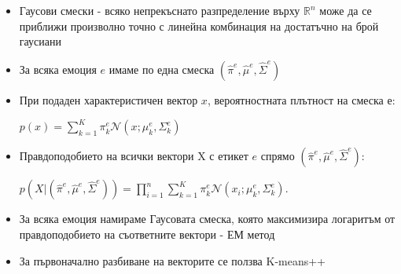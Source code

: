 \documentclass[9pt]{beamer}
\begin{document}
\begin{frame}[t]
    \begin{itemize}
        \item Гаусови смески
        \pause - всяко непрекъснато разпределение върху $\mathbb{R}^{n}$ може да се приближи произволно точно с линейна комбинация на достатъчно на брой гаусиани
        \pause
        \item За всяка емоция $e$ имаме по една смеска $(\hat{\pi}^e, \hat{\mu}^e, \hat{\Sigma}^e)$
        \pause
        \item При подаден характеристичен вектор $x$, вероятностната плътност на смеска е:
        \pause

        $p(x) = \sum\limits_{k=1}^{K} \pi_k^e \mathcal{N}(x; \mu_k^e, \Sigma_k^e)$
        \pause
        \item Правдоподобието на всички вектори X с етикет $e$ спрямо $(\hat{\pi}^e, \hat{\mu}^e, \hat{\Sigma}^e)$:
        \pause    
    
        $p(X|(\hat{\pi}^e, \hat{\mu}^e, \hat{\Sigma}^e)) = \prod\limits_{i=1}^{n} \sum\limits_{k=1}^{K} \pi_k^e \mathcal{N}(x_i; \mu_k^e, \Sigma_k^e)$.
        \pause
        \item За всяка емоция намираме Гаусовата смеска, която максимизира логаритъм от правдоподобието на съответните вектори
        \pause - ЕМ метод
        \pause
        \item За първоначално разбиване на векторите се ползва K-means++
    \end{itemize}
\end{frame}
\end{document}
